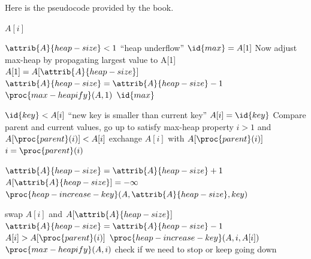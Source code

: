 \documentclass{article}
\begin{document}
Here is the pseudocode provided by the book.
\begin{codebox}
\li \Return $A[i]$
\end{codebox}

\begin{codebox}
\li \If $\attrib{A}{heap-size} < 1$
\li \Then
        \Error ``heap underflow''
    \End
\li $\id{max} = A[1]$
\li \Comment Now adjust max-heap by propagating largest value to A[1]
\li $A[1] = A[\attrib{A}{heap-size}]$
\li $\attrib{A}{heap-size} = \attrib{A}{heap-size} - 1$
\li $\proc{max-heapify}(A, 1)$
\li \Return $\id{max}$
\end{codebox}

\begin{codebox}
\li \If $\id{key} < A[i]$
\li \Then
        \Error ``new key is smaller than current key''
    \End
\li $A[i] = \id{key}$
\li \Comment Compare parent and current values, go up to satisfy max-heap property
\li \While $i >  1$ and $A[\proc{parent}(i)] < A[i]$
\li \Do
        exchange $A[i]$ with $A[\proc{parent}(i)]$
\li     $i = \proc{parent}(i)$
    \End
\end{codebox}

\begin{codebox}
\li $\attrib{A}{heap-size} = \attrib{A}{heap-size} + 1$
\li $A[\attrib{A}{heap-size}] = -\infty$
\li $\proc{heap-increase-key}(A, \attrib{A}{heap-size}, key)$
\end{codebox}

\begin{codebox}
\li swap $A[i]$ and $A[\attrib{A}{heap-size}]$
\li $\attrib{A}{heap-size} = \attrib{A}{heap-size} - 1$
\li \If $A[i] > A[\proc{parent}(i)]$
\li \Then
        $\proc{heap-increase-key}(A, i, A[i])$
    \End
\li \Else
\li \Then
        $\proc{max-heapify}(A, i)$ \Comment check if we need to stop or keep going down
    \End
\end{codebox}
\end{document}

